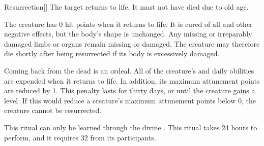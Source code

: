\lowercase{\hypertarget{spell:Resurrection}{}}\label{spell:Resurrection}
\begin{freeability}[Rank 4]{\hypertarget{spell:Resurrection}{Resurrection}}[]
The target returns to life.
It must not have died due to old age.

The creature has 0 hit points when it returns to life.
It is cured of all  and other negative effects, but the body's shape is unchanged.
Any missing or irreparably damaged limbs or organs remain missing or damaged.
The creature may therefore die shortly after being resurrected if its body is excessively damaged.

Coming back from the dead is an ordeal.
All of the creature's  and daily abilities are expended when it returns to life.
In addition, its maximum attunement points are reduced by 1.
This penalty lasts for thirty days, or until the creature gains a level.
If this would reduce a creature's maximum attunement points below 0, the creature cannot be resurrected.

This ritual can only be learned through the divine .
This ritual takes 24 hours to perform, and it requires 32  from its participants.
\end{freeability}
\vspace{0.25em}



